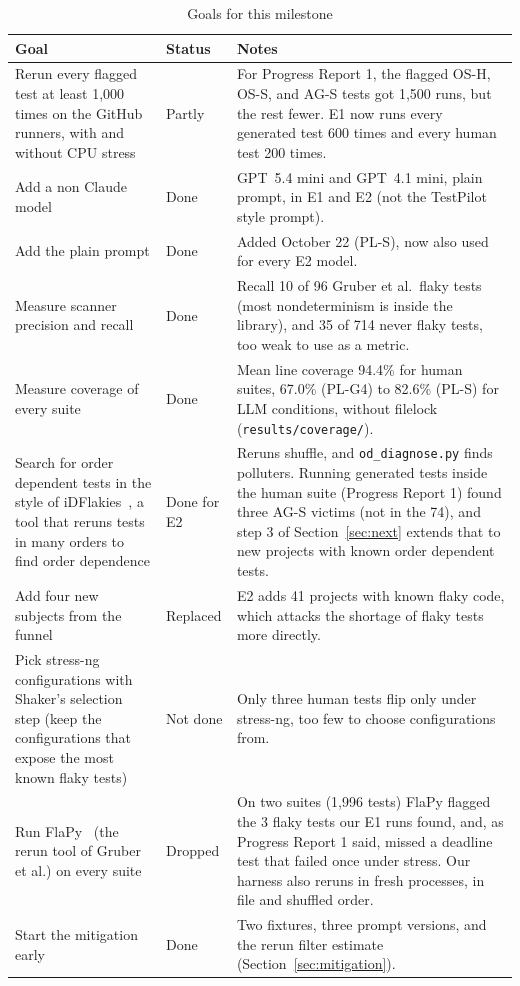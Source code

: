 \documentclass[sigconf,nonacm]{acmart}
\begin{document}
\begin{table}[t]
\caption{Goals for this milestone}
\label{tab:goals}
\small
\begin{tabularx}{\textwidth}{p{5.6cm}p{1.6cm}X}
\toprule
Goal & Status & Notes \\
\midrule
Rerun every flagged test at least 1,000 times on the GitHub runners, with and without CPU stress & Partly & For Progress Report 1, the flagged OS-H, OS-S, and AG-S tests got 1,500 runs, but the rest fewer. E1 now runs every generated test 600 times and every human test 200 times. \\
Add a non Claude model & Done & GPT~5.4 mini and GPT~4.1 mini, plain prompt, in E1 and E2 (not the TestPilot style prompt). \\
Add the plain prompt & Done & Added October 22 (PL-S), now also used for every E2 model. \\
Measure scanner precision and recall & Done & Recall 10 of 96 Gruber et al.\ flaky tests (most nondeterminism is inside the library), and 35 of 714 never flaky tests, too weak to use as a metric. \\
Measure coverage of every suite & Done & Mean line coverage 94.4\% for human suites, 67.0\% (PL-G4) to 82.6\% (PL-S) for LLM conditions, without filelock (\texttt{results/coverage/}). \\
Search for order dependent tests in the style of iDFlakies~\cite{lam2019}, a tool that reruns tests in many orders to find order dependence & Done for E2 & Reruns shuffle, and \texttt{od\_diagnose.py} finds polluters. Running generated tests inside the human suite (Progress Report 1) found three AG-S victims (not in the 74), and step 3 of Section~\ref{sec:next} extends that to new projects with known order dependent tests. \\
Add four new subjects from the funnel & Replaced & E2 adds 41 projects with known flaky code, which attacks the shortage of flaky tests more directly. \\
Pick stress-ng configurations with Shaker's selection step (keep the configurations that expose the most known flaky tests) & Not done & Only three human tests flip only under stress-ng, too few to choose configurations from. \\
Run FlaPy~\cite{gruber2023flapy} (the rerun tool of Gruber et al.) on every suite & Dropped & On two suites (1,996 tests) FlaPy flagged the 3 flaky tests our E1 runs found, and, as Progress Report 1 said, missed a deadline test that failed once under stress. Our harness also reruns in fresh processes, in file and shuffled order. \\
Start the mitigation early & Done & Two fixtures, three prompt versions, and the rerun filter estimate (Section~\ref{sec:mitigation}). \\
\bottomrule
\end{tabularx}
\end{table}
\end{document}

